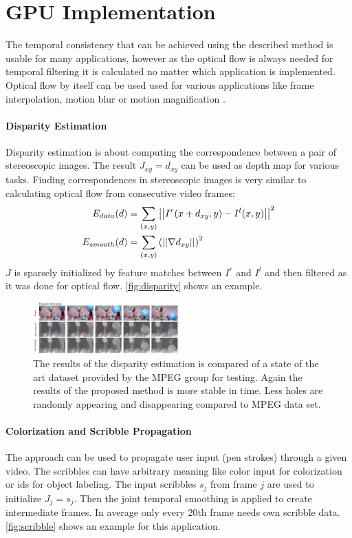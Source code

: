 \section{GPU Implementation} \label{gpu-implementation}
The temporal consistency that can be achieved using the described method is
usable for many applications, however as the optical flow is always needed for
temporal filtering it is calculated no matter which application is implemented.
Optical flow by itself can be used used for various applications like frame
interpolation, motion blur or motion magnification
\cite{journals/tog/LiuTFDA05}.

\paragraph{Disparity Estimation} \label{disparity-estimation}
Disparity estimation is about computing the correspondence between a pair of
stereoscopic images. The result $J_{xy}=d_{xy}$ can be used as depth map for
various tasks. Finding correspondences in stereoscopic images is very similar to
calculating optical flow from consecutive video frames:
\begin{align*}
  E_{data}(d) &= \sum_{(x,y)}\left|\left| I^r(x + d_{xy}, y) - I^l(x,y) \right|\right|^2\\
  E_{smooth}(d) &= \sum_{(x,y)}\left( \left|\left| \nabla d_{xy} \right|\right| \right)^2
\end{align*}
$J$ is sparsely initialized by feature matches between $I^r$ and $I^l$ and then
filtered as it was done for optical flow. \autoref{fig:disparity} shows an
example.
\begin{figure}[htb]
  \centering
  \includegraphics[width=0.5\textwidth]{images/disparity.png}
  \caption{The results of the disparity estimation is compared of a state of the
  art dataset provided by the MPEG group for testing. Again the results of the
proposed method is more stable in time. Less holes are randomly appearing and
disappearing compared to MPEG data set.}
  \label{fig:disparity}
\end{figure}

\paragraph{Colorization and Scribble Propagation} \label{colorization}
The approach can be used to propagate user input (pen strokes) through a given
video. The scribbles can have arbitrary meaning like color input for
colorization or ids for object labeling. The input scribbles $s_j$ from frame
$j$ are used to initialize $J_j = s_j$. Then the joint temporal smoothing is
applied to create intermediate frames. In average only every 20th frame needs
own scribble data.  \autoref{fig:scribble} shows an example for this
application.


